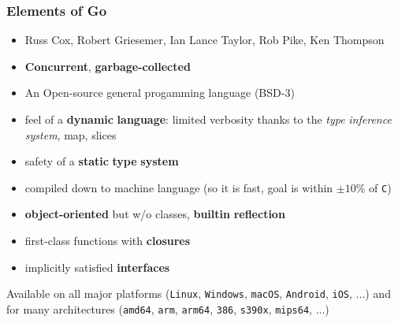 \documentclass[9pt]{beamer}
\begin{document}
\begin{frame}[fragile]
\frametitle{Elements of Go}


\begin{itemize}
\item Russ Cox, Robert Griesemer, Ian Lance Taylor, Rob Pike, Ken Thompson
\end{itemize}

\begin{itemize}
\item \textbf{Concurrent}, \textbf{garbage-collected}
\item An Open-source general progamming language (BSD-3)
\item feel of a \textbf{dynamic} \textbf{language}: limited verbosity thanks to the \emph{type} \emph{inference} \emph{system}, map, slices
\item safety of a \textbf{static} \textbf{type} \textbf{system}
\item compiled down to machine language (so it is fast, goal is within $\pm 10\%$ of \texttt{C})
\item \textbf{object-oriented} but w/o classes, \textbf{builtin} \textbf{reflection}
\item first-class functions with \textbf{closures}
\item implicitly satisfied \textbf{interfaces}
\end{itemize}

Available on all major platforms (\texttt{Linux}, \texttt{Windows}, \texttt{macOS}, \texttt{Android}, \texttt{iOS}, ...) and for many architectures (\texttt{amd64}, \texttt{arm}, \texttt{arm64}, \texttt{386}, \texttt{s390x}, \texttt{mips64}, ...)



\end{frame}
\end{document}
